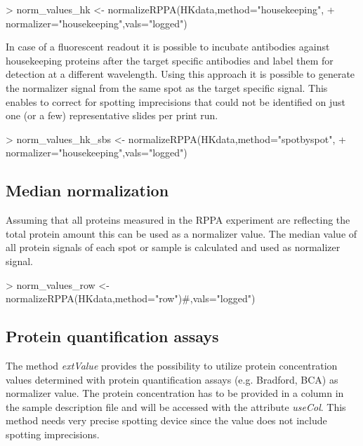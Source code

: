\documentclass[12pt]{article}
\newcommand{\Rfunarg}[1]{{\textit{#1}}}
\begin{document}
\begin{Schunk}
\begin{Sinput}
> norm_values_hk <- normalizeRPPA(HKdata,method="housekeeping",
+                              normalizer="housekeeping",vals="logged")
\end{Sinput}
\end{Schunk}

In case of a fluorescent readout it is possible to incubate antibodies against housekeeping proteins after the target
specific antibodies and label them for detection at a different wavelength. Using this approach it is
possible to generate the normalizer signal from the same spot as the target specific signal. This
enables to correct for spotting imprecisions that could not be identified on just one (or a few) representative
slides per print run.

\begin{Schunk}
\begin{Sinput}
> norm_values_hk_sbs <- normalizeRPPA(HKdata,method="spotbyspot",
+                              normalizer="housekeeping",vals="logged")
\end{Sinput}
\end{Schunk}

\subsection{Median normalization}

Assuming that all proteins measured in the RPPA experiment are reflecting the total protein amount this can be used
as a normalizer value. The median value of all protein signals of each spot or sample is calculated and used as normalizer signal. 

\begin{Schunk}
\begin{Sinput}
> norm_values_row <- normalizeRPPA(HKdata,method="row")#,vals="logged")
\end{Sinput}
\end{Schunk}

  
\subsection{Protein quantification assays}

The method \Rfunarg{extValue} provides the possibility to utilize protein concentration values 
determined with protein quantification assays (e.g. Bradford, BCA) as normalizer value. 
The protein concentration has to be provided in a column in the sample description 
file and will be accessed with the attribute \Rfunarg{useCol}. This method needs very precise spotting device
since the value does not include spotting imprecisions.
\end{document}
